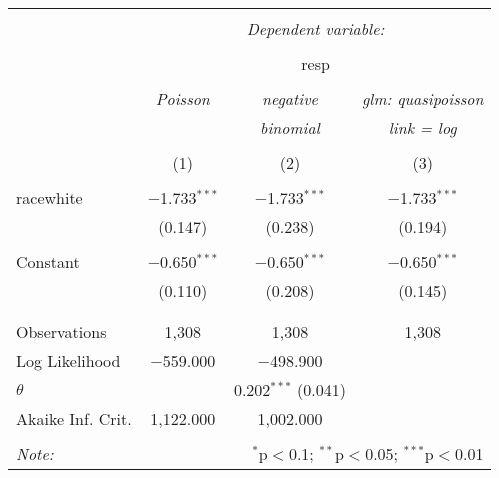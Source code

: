 
\begin{table}[!htbp] \centering 
  \caption{} 
  \label{} 
\begin{tabular}{@{\extracolsep{5pt}}lccc} 
\\[-1.8ex]\hline 
\hline \\[-1.8ex] 
 & \multicolumn{3}{c}{\textit{Dependent variable:}} \\ 
\cline{2-4} 
\\[-1.8ex] & \multicolumn{3}{c}{resp} \\ 
\\[-1.8ex] & \textit{Poisson} & \textit{negative} & \textit{glm: quasipoisson} \\ 
 & \textit{} & \textit{binomial} & \textit{link = log} \\ 
\\[-1.8ex] & (1) & (2) & (3)\\ 
\hline \\[-1.8ex] 
 racewhite & $-$1.733$^{***}$ & $-$1.733$^{***}$ & $-$1.733$^{***}$ \\ 
  & (0.147) & (0.238) & (0.194) \\ 
  & & & \\ 
 Constant & $-$0.650$^{***}$ & $-$0.650$^{***}$ & $-$0.650$^{***}$ \\ 
  & (0.110) & (0.208) & (0.145) \\ 
  & & & \\ 
\hline \\[-1.8ex] 
Observations & 1,308 & 1,308 & 1,308 \\ 
Log Likelihood & $-$559.000 & $-$498.900 &  \\ 
$\theta$ &  & 0.202$^{***}$  (0.041) &  \\ 
Akaike Inf. Crit. & 1,122.000 & 1,002.000 &  \\ 
\hline 
\hline \\[-1.8ex] 
\textit{Note:}  & \multicolumn{3}{r}{$^{*}$p$<$0.1; $^{**}$p$<$0.05; $^{***}$p$<$0.01} \\ 
\end{tabular} 
\end{table} 
